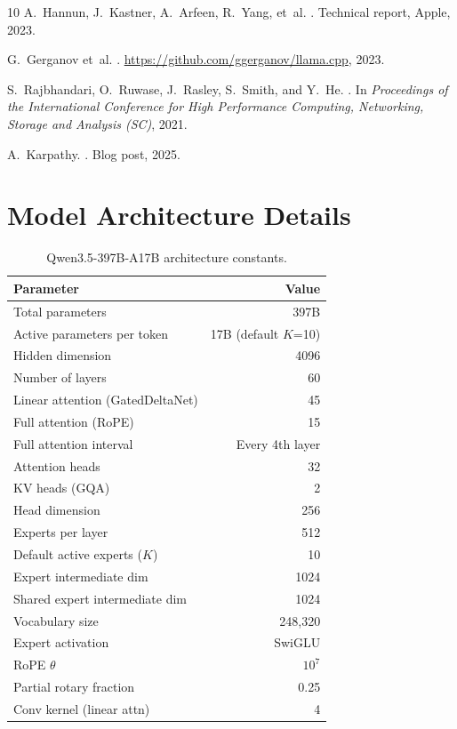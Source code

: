 \documentclass[11pt,twocolumn]{article}
\begin{document}
\begin{thebibliography}{10}
A.~Hannun, J.~Kastner, A.~Arfeen, R.~Yang, et~al.
.
\newblock Technical report, Apple, 2023.

G.~Gerganov et~al.
.
\newblock \url{https://github.com/ggerganov/llama.cpp}, 2023.

S.~Rajbhandari, O.~Ruwase, J.~Rasley, S.~Smith, and Y.~He.
.
\newblock In \emph{Proceedings of the International Conference for High Performance Computing, Networking, Storage and Analysis (SC)}, 2021.

A.~Karpathy.
.
\newblock Blog post, 2025.

\end{thebibliography}

\appendix

\section{Model Architecture Details}

\begin{table}[h]
\centering
\small
\caption{Qwen3.5-397B-A17B architecture constants.}
\begin{tabular}{@{}lr@{}}
\toprule
\textbf{Parameter} & \textbf{Value} \\
\midrule
Total parameters & 397B \\
Active parameters per token & 17B (default $K$=10) \\
Hidden dimension & 4096 \\
Number of layers & 60 \\
\quad Linear attention (GatedDeltaNet) & 45 \\
\quad Full attention (RoPE) & 15 \\
Full attention interval & Every 4th layer \\
Attention heads & 32 \\
KV heads (GQA) & 2 \\
Head dimension & 256 \\
Experts per layer & 512 \\
Default active experts ($K$) & 10 \\
Expert intermediate dim & 1024 \\
Shared expert intermediate dim & 1024 \\
Vocabulary size & 248{,}320 \\
Expert activation & SwiGLU \\
RoPE $\theta$ & $10^7$ \\
Partial rotary fraction & 0.25 \\
Conv kernel (linear attn) & 4 \\
\bottomrule
\end{tabular}
\end{table}
\end{document}

